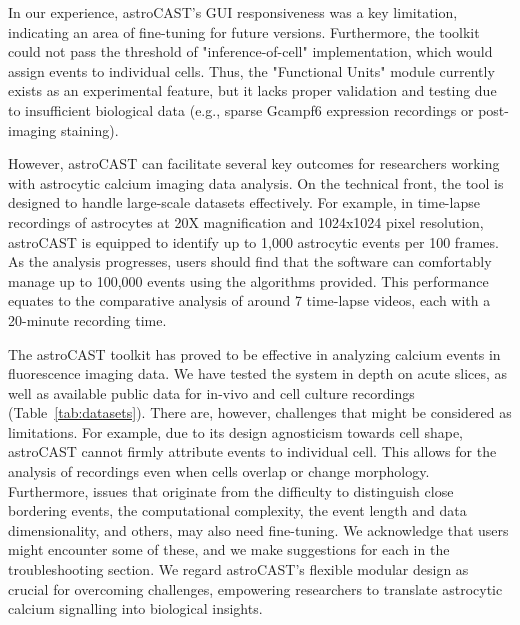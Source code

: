 \documentclass[utf8]{FrontiersinHarvard}
\newcommand{\tref}[1]{ (Table~\ref{tab:#1})}
\begin{document}
    In our experience, astroCAST's \ac{GUI} responsiveness was a key limitation, indicating an area of fine-tuning for future versions. Furthermore, the toolkit could not pass the threshold of "inference-of-cell" implementation, which would assign events to individual cells. Thus, the "Functional Units" module currently exists as an experimental feature, but it lacks proper validation and testing due to insufficient biological data (e.g., sparse Gcampf6 expression recordings or post-imaging staining).

    However, \ac{astroCAST} can facilitate several key outcomes for researchers working with astrocytic calcium imaging data analysis. On the technical front, the tool is designed to handle large-scale datasets effectively. For example, in time-lapse recordings of astrocytes at 20X magnification and 1024x1024 pixel resolution, astroCAST is equipped to identify up to 1,000 astrocytic events per 100 frames. As the analysis progresses, users should find that the software can comfortably manage up to 100,000 events using the algorithms provided. This performance equates to the comparative analysis of around 7 time-lapse videos, each with a 20-minute recording time.

    The astroCAST toolkit has proved to be effective in analyzing calcium events in fluorescence imaging data. We have tested the system in depth on acute slices, as well as available public data for in-vivo and cell culture recordings\tref{datasets}. There are, however, challenges that might be considered as limitations. For example, due to its design agnosticism towards cell shape, astroCAST cannot firmly attribute events to individual cell. This allows for the analysis of recordings even when cells overlap or change morphology. Furthermore, issues that originate from the difficulty to distinguish close bordering events, the computational complexity, the event length and data dimensionality, and others, may also need fine-tuning. We acknowledge that users might encounter some of these, and we make suggestions for each in the troubleshooting section. We regard astroCAST's flexible modular design as crucial for overcoming challenges, empowering researchers to translate astrocytic calcium signalling into biological insights.
\end{document}
